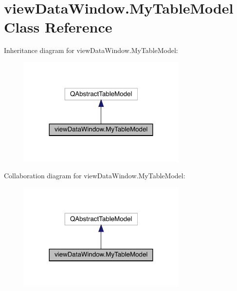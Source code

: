 \hypertarget{classview_data_window_1_1_my_table_model}{}\section{view\+Data\+Window.\+My\+Table\+Model Class Reference}
\label{classview_data_window_1_1_my_table_model}


Inheritance diagram for view\+Data\+Window.\+My\+Table\+Model\+:\nopagebreak
\begin{figure}[H]
\begin{center}
\leavevmode
\includegraphics[width=239pt]{classview_data_window_1_1_my_table_model__inherit__graph}
\end{center}
\end{figure}


Collaboration diagram for view\+Data\+Window.\+My\+Table\+Model\+:\nopagebreak
\begin{figure}[H]
\begin{center}
\leavevmode
\includegraphics[width=239pt]{classview_data_window_1_1_my_table_model__coll__graph}
\end{center}
\end{figure}
